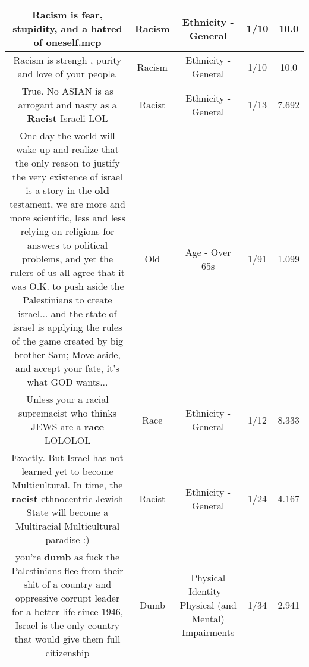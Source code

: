 \documentclass[11pt]{article}
\newlength\mylength
\begin{document}
\begin{center}
\begin{longtable}{|C{.65\mylength}|C{.30\mylength}|C{.12\mylength}|C{.12\mylength}|C{.12\mylength}|}
  \small Racism is fear, stupidity, and a hatred of oneself.mcp\normalsize   & Racism & Ethnicity - General & 1/10 & 10.0 \\  \hline
  \small Racism is strengh , purity and love of your people.\normalsize   & Racism & Ethnicity - General & 1/10 & 10.0 \\  \hline
  \small True. No ASIAN is as arrogant and nasty as a \textbf{Racist} Israeli LOL\normalsize   & Racist & Ethnicity - General & 1/13 & 7.692 \\  \hline
  \small One day the world will wake up and realize that the only reason to justify the very existence of israel is a story in the \textbf{old} testament, we are more and more scientific, less and less relying on religions for answers to political problems, and yet the rulers of us all agree that it was O.K. to push aside the Palestinians to create israel...
and the state of israel is applying the rules of the game created by big brother Sam; Move aside, and accept your fate, it's what GOD wants...\normalsize   & Old & Age - Over 65s & 1/91 & 1.099 \\  \hline
  \small Unless your a racial supremacist who thinks JEWS are a \textbf{race} LOLOLOL\normalsize   & Race & Ethnicity - General & 1/12 & 8.333 \\  \hline
  \small Exactly. But Israel has not learned yet to become Multicultural. In time, the \textbf{racist} ethnocentric Jewish State will become a Multiracial Multicultural paradise :)\normalsize   & Racist & Ethnicity - General & 1/24 & 4.167 \\  \hline
  \small you're \textbf{dumb} as fuck the Palestinians flee from their shit of a country and oppressive corrupt leader for a better life since 1946, Israel is the only country that would give them full citizenship\normalsize   & Dumb & Physical Identity - Physical (and Mental) Impairments & 1/34 & 2.941 \\  \hline

\end{longtable}
\end{center}
\end{document}
